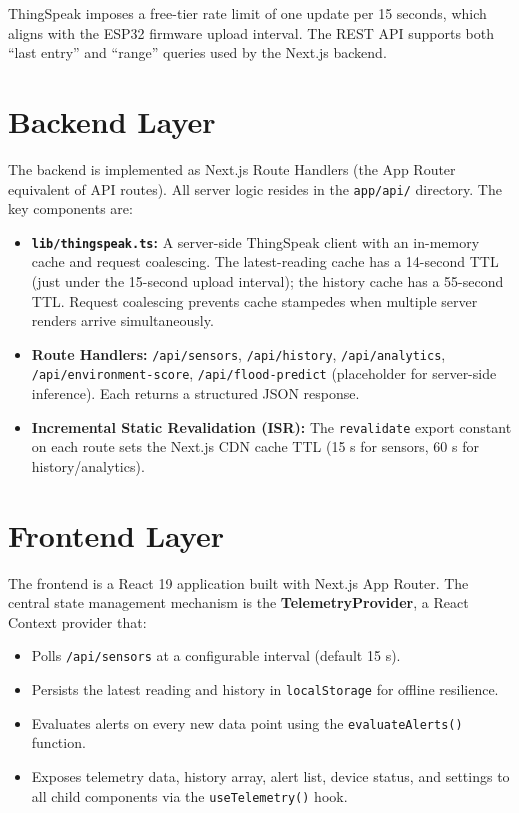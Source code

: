 ThingSpeak imposes a free-tier rate limit of one update per 15 seconds, which aligns with the ESP32 firmware upload interval. The REST API supports both ``last entry'' and ``range'' queries used by the Next.js backend.

\section{Backend Layer}

The backend is implemented as Next.js Route Handlers (the App Router equivalent of API routes). All server logic resides in the \texttt{app/\allowbreak{}api/\allowbreak{}} directory. The key components are:

\begin{itemize}[leftmargin=1.5em]
  \item \textbf{\texttt{lib/\allowbreak{}thingspeak.\allowbreak{}ts}:} A server-side ThingSpeak client with an in-memory cache and request coalescing. The latest-reading cache has a 14-second TTL (just under the 15-second upload interval); the history cache has a 55-second TTL. Request coalescing prevents cache stampedes when multiple server renders arrive simultaneously.
  \item \textbf{Route Handlers:} \texttt{/\allowbreak{}api/\allowbreak{}sensors}, \texttt{/\allowbreak{}api/\allowbreak{}history}, \texttt{/\allowbreak{}api/\allowbreak{}analytics}, \texttt{/\allowbreak{}api/\allowbreak{}environment-score}, \texttt{/\allowbreak{}api/\allowbreak{}flood-predict} (placeholder for server-side inference). Each returns a structured JSON response.
  \item \textbf{Incremental Static Revalidation (ISR):} The \texttt{revalidate} export constant on each route sets the Next.js CDN cache TTL (15 s for sensors, 60 s for history/analytics).
\end{itemize}

\section{Frontend Layer}

The frontend is a React 19 application built with Next.js App Router. The central state management mechanism is the \textbf{TelemetryProvider}, a React Context provider that:

\begin{itemize}[leftmargin=1.5em]
  \item Polls \texttt{/\allowbreak{}api/\allowbreak{}sensors} at a configurable interval (default 15 s).
  \item Persists the latest reading and history in \texttt{localStorage} for offline resilience.
  \item Evaluates alerts on every new data point using the \texttt{evaluateAlerts()} function.
  \item Exposes telemetry data, history array, alert list, device status, and settings to all child components via the \texttt{useTelemetry()} hook.
\end{itemize}

